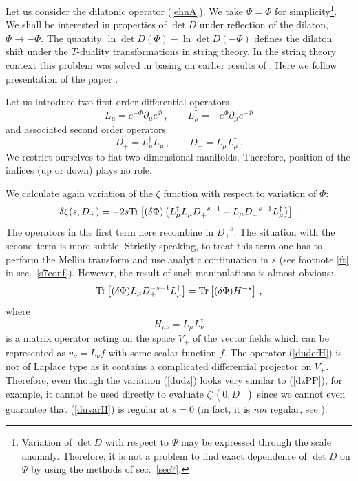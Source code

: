 Let us consider the dilatonic operator (\ref{ehnA}).
We take $\Psi =\Phi$ for simplicity\footnote{Variation of $\det D$
with respect to $\Psi$ may be expressed through the scale anomaly.
Therefore, it is not a problem to find exact dependence of $\det D$
on $\Psi$ by using the methods of sec.\ \ref{sec7}.}. We shall be
interested in properties of $\det D$ under reflection of the dilaton,
$\Phi\to -\Phi$. The quantity $\ln \det D (\Phi) - \ln \det D(-\Phi)$
defines the dilaton shift under the $T$-duality transformations
in string theory. In the string theory context this problem was
solved in \cite{Schwarz:1993te} basing on earlier results of
\cite{Schwarz:1979ae}. Here we follow presentation of 
the paper \cite{Vassilevich:2000kt}.

Let us introduce two first order differential operators
\begin{equation}
L_\mu =e^{-\Phi}\partial_\mu e^{\Phi}\,,\qquad
L_\mu^\dag =-e^{\Phi}\partial_\mu e^{-\Phi}
\label{LLdag}
\end{equation}
and associated second order operators
\begin{equation}
D_+=L_\mu^\dag L_\mu \,,\qquad 
D_-=L_\mu L_\mu^\dag \,. \label{DpDm}
\end{equation}
We restrict ourselves to flat two-dimensional manifolds.
Therefore, position of the indices (up or down) plays no role.

We calculate again variation of the $\zeta$ function with respect
to variation of $\Phi$:
\begin{equation}
\delta \zeta (s,D_+)=-2s {\rm Tr} \left[
(\delta \Phi ) \left( L_\mu^\dag L_\mu D_+^{-s-1}
-L_\mu D_+^{-s-1} L_\mu^\dag \right)\right]\,.\label{dudz}
\end{equation}
The operators in the first term here recombine in $D_+^{-s}$. The situation
with the second term is more subtle. Strictly speaking, to treat this
term one has to perform the Mellin transform and use analytic continuation
in $s$  (see footnote \ref{ft} in sec.\ \ref{s7conf}). However, the
result of such manipulations is almost obvious:
\begin{equation}
{\rm Tr} \left[ (\delta \Phi) L_\mu D_+^{-s-1} L_\mu^\dag \right]=
{\rm Tr} \left[ (\delta \Phi) H^{-s} \right] \,,\label{duvarH}
\end{equation}
where
\begin{equation}
H_{\mu\nu}=L_\mu L_\nu^\dag \label{dudefH}
\end{equation}
is a matrix operator acting on the space $V_+$ of the vector fields
which can be represented as $v_\nu = L_\nu f$ with some scalar
function $f$. The operator (\ref{dudefH}) is not of Laplace type
as it contains a complicated differential projector on $V_+$.
Therefore, even though the variation (\ref{dudz}) looks very
similar to (\ref{dzPP}), for example, it cannot be used directly
to evaluate $\zeta'(0,D_+)$ since we cannot even guarantee that
(\ref{duvarH}) is regular at $s=0$ (in fact, it is {\it not}
regular, see \cite{Vassilevich:2000kt}).  

